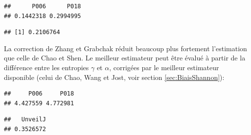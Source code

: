 \documentclass[
  11pt,
  french,
  a4paper,
  extrafontsizes,onecolumn,openright
  ]{memoir}
\newenvironment{Shaded}{\begin{snugshade}}{\end{snugshade}}
\newcommand{\CommentTok}[1]{\textcolor[rgb]{0.56,0.35,0.01}{\textit{#1}}}
\newcommand{\DataTypeTok}[1]{\textcolor[rgb]{0.13,0.29,0.53}{#1}}
\newcommand{\DecValTok}[1]{\textcolor[rgb]{0.00,0.00,0.81}{#1}}
\newcommand{\KeywordTok}[1]{\textcolor[rgb]{0.13,0.29,0.53}{\textbf{#1}}}
\newcommand{\NormalTok}[1]{#1}
\newcommand{\OperatorTok}[1]{\textcolor[rgb]{0.81,0.36,0.00}{\textbf{#1}}}
\newcommand{\OtherTok}[1]{\textcolor[rgb]{0.56,0.35,0.01}{#1}}
\newcommand{\StringTok}[1]{\textcolor[rgb]{0.31,0.60,0.02}{#1}}
\begin{document}
\begin{verbatim}
##      P006      P018 
## 0.1442318 0.2994995
\end{verbatim}

\begin{Shaded}
\end{Shaded}

\begin{verbatim}
## [1] 0.2106764
\end{verbatim}

\normalsize

La correction de Zhang et Grabchak réduit beaucoup plus fortement l'estimation que celle de Chao et Shen.
Le meilleur estimateur peut être évalué à partir de la différence entre les entropies \(\gamma\) et \(\alpha\), corrigées par le meilleur estimateur disponible (celui de Chao, Wang et Jost, voir section \ref{sec:BiaisShannon}):

\scriptsize

\begin{Shaded}
\end{Shaded}

\begin{verbatim}
##     P006     P018 
## 4.427559 4.772981
\end{verbatim}

\begin{Shaded}
\end{Shaded}

\begin{verbatim}
##   UnveilJ 
## 0.3526572
\end{verbatim}
\end{document}
